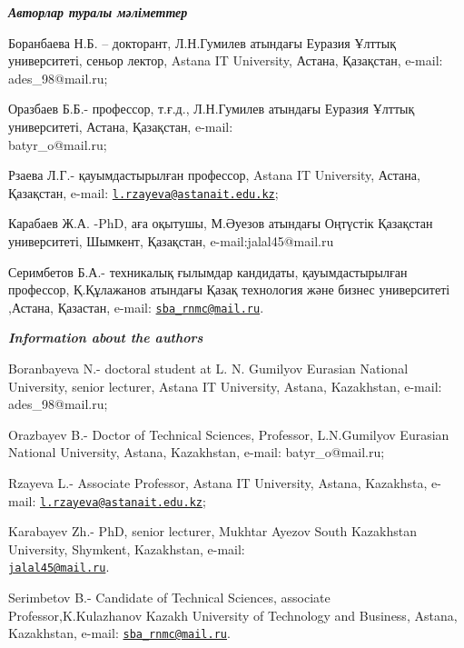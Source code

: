 \begin{authorinfo}
\hspace{1em}\emph{{\bfseries Авторлар туралы мәліметтер}}

Боранбаева Н.Б. -- докторант, Л.Н.Гумилев атындағы Еуразия Ұлттық
университеті, сеньор лектор, Astana IT University, Астана, Қазақстан,
e-mail: ades\_98@mail.ru;

Оразбаев Б.Б.- профессор, т.ғ.д., Л.Н.Гумилев атындағы Еуразия Ұлттық
университеті, Астана, Қазақстан, e-mail: \\batyr\_o@mail.ru;

Рзаева Л.Г.- қауымдастырылған профессор, Astana IT University, Астана,
Қазақстан, e-mail:
\href{mailto:l.rzayeva@astanait.edu.kz}{\nolinkurl{l.rzayeva@astanait.edu.kz}};

Карабаев Ж.А. -PhD, аға оқытушы, М.Әуезов атындағы Оңтүстік Қазақстан
университеті, Шымкент, Қазақстан, e-mail:jalal45@mail.ru

Серимбетов Б.А.- техникалық ғылымдар кандидаты, қауымдастырылған
профессор, Қ.Құлажанов атындағы Қазақ технология және бизнес
университеті ,Астана, Қазастан, e-mail:
\href{mailto:sba_rnmc@mail.ru}{\nolinkurl{sba\_rnmc@mail.ru}}.

\hspace{1em}\emph{{\bfseries Information about the authors}}

Boranbayeva N.- doctoral student at L. N. Gumilyov Eurasian National
University, senior lecturer, Astana IT University, Astana, Kazakhstan,
e-mail: ades\_98@mail.ru;

Orazbayev B.- Doctor of Technical Sciences, Professor, L.N.Gumilyov
Eurasian National University, Astana, Kazakhstan, e-mail:
batyr\_o@mail.ru;

Rzayeva L.- Associate Professor, Astana IT University, Astana,
Kazakhsta, e-mail:
\href{mailto:l.rzayeva@astanait.edu.kz}{\nolinkurl{l.rzayeva@astanait.edu.kz}};

Karabayev Zh.- PhD, senior lecturer, Mukhtar Ayezov South Kazakhstan
University, Shymkent, Kazakhstan, e-mail:
\\\href{mailto:jalal45@mail.ru}{\nolinkurl{jalal45@mail.ru}}.

Serimbetov B.- Candidate of Technical Sciences, associate
Professor,K.Kulazhanov Kazakh University of Technology and Business,
Astana, Kazakhstan, e-mail:
\href{mailto:sba_rnmc@mail.ru}{\nolinkurl{sba\_rnmc@mail.ru}}.
\end{authorinfo}

